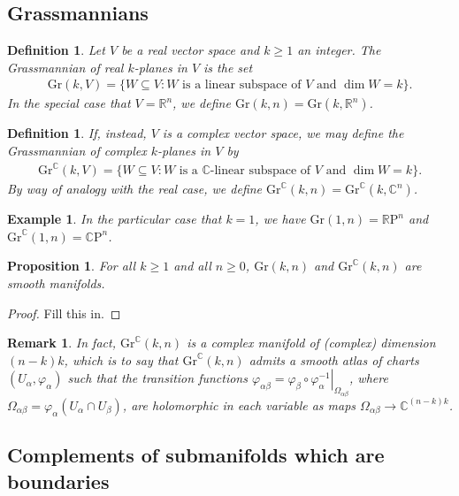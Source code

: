 \documentclass{amsart}          %
\newtheorem{proposition}[theorem]{Proposition}
\newtheorem{definition}[theorem]{Definition}
\newtheorem{remark}[theorem]{Remark}
\newtheorem{example}[theorem]{Example}
\newcommand{\R}{\mathbb R}
\newcommand{\C}{\mathbb C}
\newcommand{\RP}{\mathbb{R}\mathrm{P}}
\newcommand{\CP}{\mathbb{C}\mathrm{P}}
\newcommand{\Gr}{\mathrm{Gr}}
\begin{document}
\subsection{Grassmannians}
\begin{definition}
	Let $V$ be a real vector space and $k\geq 1$ an integer. The \textit{Grassmannian of real $k$-planes in $V$} is the set\begin{align*}
	\Gr(k,V)=\{W\subseteq V:\text{$W$ is a linear subspace of $V$ and $\dim W=k$}\}.
	\end{align*}
	In the special case that $V=\R^n$, we define $\Gr(k,n)=\Gr(k,\R^n)$.
\end{definition}
\begin{definition}
	If, instead, $V$ is a \textit{complex} vector space, we may define the \textit{Grassmannian of complex $k$-planes in $V$} by\begin{align*}
	\Gr^\C(k,V)=\{W\subseteq V:\text{$W$ is a $\C$-linear subspace of $V$ and $\dim W=k$}\}.
	\end{align*}
	By way of analogy with the real case, we define $\Gr^\C(k,n)=\Gr^\C(k,\C^n)$.
\end{definition}
\begin{example}
	In the particular case that $k=1$, we have $\Gr(1,n)=\RP^n$ and $\Gr^\C(1,n)=\CP^n$.
\end{example}
\begin{proposition}
	For all $k\geq 1$ and all $n\geq 0$, $\Gr(k,n)$ and $\Gr^\C(k,n)$ are smooth manifolds.
\end{proposition}
\begin{proof}
	Fill this in.
\end{proof}
\begin{remark}
	In fact, $\Gr^\C(k,n)$ is a complex manifold of (complex) dimension $(n-k)k$, which is to say that $\Gr^\C(k,n)$ admits a smooth atlas of charts $(U_\alpha,\varphi_\alpha)$ such that the transition functions $\varphi_{\alpha\beta}=\left.\varphi_\beta\circ\varphi_{\alpha}^{-1}\right|_{\Omega_{\alpha\beta}}$, where $\Omega_{\alpha\beta}=\varphi_\alpha(U_\alpha\cap U_\beta)$, are holomorphic in each variable as maps $\Omega_{\alpha\beta}\to\C^{(n-k)k}$.
\end{remark}

\subsection{Complements of submanifolds which are boundaries}
\end{document}
